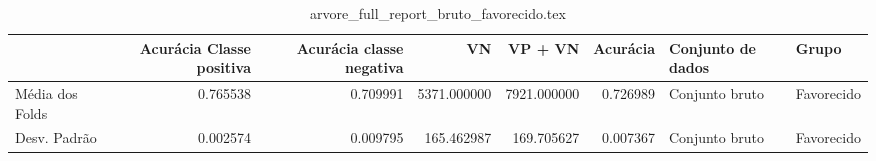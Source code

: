 \begin{table}
\centering
\caption{arvore_full_report_bruto_favorecido.tex}
\label{arvore_full_report_bruto_favorecido.tex}
\begin{tabular}{lrrrrrll}
\toprule
{}              &  Acurácia Classe positiva &  Acurácia classe negativa &          VN  &     VP + VN  &  Acurácia & Conjunto de dados &       Grupo \\
\midrule
Média dos Folds &                  0.765538 &                  0.709991 &  5371.000000 &  7921.000000 &  0.726989 &    Conjunto bruto &  Favorecido \\
Desv. Padrão    &                  0.002574 &                  0.009795 &   165.462987 &   169.705627 &  0.007367 &    Conjunto bruto &  Favorecido \\
\bottomrule
\end{tabular}
\end{table}

